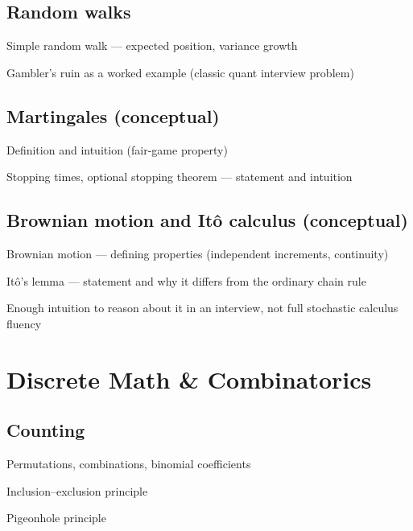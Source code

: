 \subsection{Random walks}
\begin{tasklist}
    \item Simple random walk — expected position, variance growth
    \item Gambler's ruin as a worked example (classic quant interview problem)
\end{tasklist}

\subsection{Martingales (conceptual)}
\begin{tasklist}
    \item Definition and intuition (fair-game property)
    \item Stopping times, optional stopping theorem — statement and intuition
\end{tasklist}

\subsection{Brownian motion and Itô calculus (conceptual)}
\begin{tasklist}
    \item Brownian motion — defining properties (independent increments, continuity)
    \item Itô's lemma — statement and why it differs from the ordinary chain rule
    \item Enough intuition to reason about it in an interview, not full stochastic calculus fluency
\end{tasklist}

\section{Discrete Math \& Combinatorics}

\subsection{Counting}
\begin{tasklist}
    \item Permutations, combinations, binomial coefficients
    \item Inclusion--exclusion principle
    \item Pigeonhole principle
\end{tasklist}

